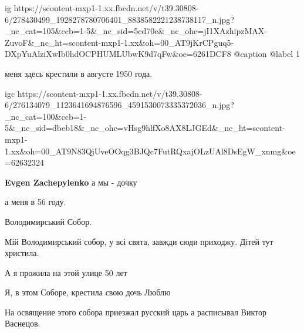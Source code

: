  
 
 
 
 

\ifcmt
  ig https://scontent-mxp1-1.xx.fbcdn.net/v/t39.30808-6/278430499_1928278780706401_8838582221238738117_n.jpg?_nc_cat=105&ccb=1-5&_nc_sid=5cd70e&_nc_ohc=jI1XAzhipzMAX-ZuvoF&_nc_ht=scontent-mxp1-1.xx&oh=00_AT9jKrCPguq5-DXpYuAlziXwIb0hdOCPHUMLUbwK9d7qFw&oe=6261DCF8
  @caption @label 1
\fi

меня здесь крестили в августе 1950 года.

\ifcmt
  igc https://scontent-mxp1-1.xx.fbcdn.net/v/t39.30808-6/276134079_1123641694876596_4591530073335372036_n.jpg?_nc_cat=100&ccb=1-5&_nc_sid=dbeb18&_nc_ohc=vHsg9hlfXo8AX8LJGEd&_nc_ht=scontent-mxp1-1.xx&oh=00_AT9N83QjUveOOqg3BJQc7FutRQxajOLzUAl8DsEgW_xnmg&oe=62632324
\fi

\textbf{Evgen Zachepylenko} а мы - дочку

а меня в 56 году.

Володимирський Собор.

Мій Володимирський собор, у всі свята, завжди сюди приходжу. Дітей тут христила.

А я прожила на этой улице 50 лет

Я, в этом Соборе, крестила свою дочь
Люблю

На освящение этого собора приезжал русский царь а расписывал Виктор Васнецов.
